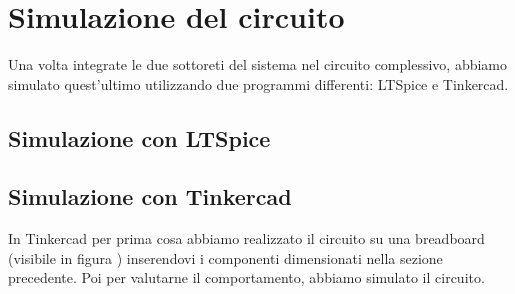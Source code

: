 \documentclass{report}
\begin{document}
\newpage
\section{Simulazione del circuito}
Una volta integrate le due sottoreti del sistema nel circuito complessivo, abbiamo simulato quest'ultimo utilizzando due programmi differenti: LTSpice e Tinkercad.
\subsection{Simulazione con LTSpice}
\subsection{Simulazione con Tinkercad}
In Tinkercad per prima cosa abbiamo realizzato il circuito su una breadboard (visibile in figura ) inserendovi i componenti dimensionati nella sezione precedente.
Poi per valutarne il comportamento, abbiamo simulato il circuito.
\end{document}
